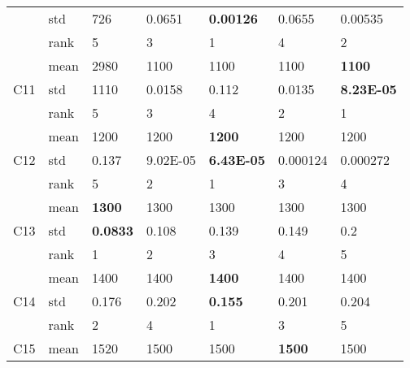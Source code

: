 \begin{table}[]
\begin{tabular}{|l|l|l|l|l|l|l|}
                     & std  & 726              & 0.0651            & \textbf{0.00126}  & 0.0655            & 0.00535           \\ \cline{2-7} 
                     & rank & 5                & 3                 & 1                 & 4                 & 2                 \\ \hline
\multirow{3}{*}{C11} & mean & 2980             & 1100              & 1100              & 1100              & \textbf{1100}     \\ \cline{2-7} 
                     & std  & 1110             & 0.0158            & 0.112             & 0.0135            & \textbf{8.23E-05} \\ \cline{2-7} 
                     & rank & 5                & 3                 & 4                 & 2                 & 1                 \\ \hline
\multirow{3}{*}{C12} & mean & 1200             & 1200              & \textbf{1200}     & 1200              & 1200              \\ \cline{2-7} 
                     & std  & 0.137            & 9.02E-05          & \textbf{6.43E-05} & 0.000124          & 0.000272          \\ \cline{2-7} 
                     & rank & 5                & 2                 & 1                 & 3                 & 4                 \\ \hline
\multirow{3}{*}{C13} & mean & \textbf{1300}    & 1300              & 1300              & 1300              & 1300              \\ \cline{2-7} 
                     & std  & \textbf{0.0833}  & 0.108             & 0.139             & 0.149             & 0.2               \\ \cline{2-7} 
                     & rank & 1                & 2                 & 3                 & 4                 & 5                 \\ \hline
\multirow{3}{*}{C14} & mean & 1400             & 1400              & \textbf{1400}     & 1400              & 1400              \\ \cline{2-7} 
                     & std  & 0.176            & 0.202             & \textbf{0.155}    & 0.201             & 0.204             \\ \cline{2-7} 
                     & rank & 2                & 4                 & 1                 & 3                 & 5                 \\ \hline
\multirow{3}{*}{C15} & mean & 1520             & 1500              & 1500              & \textbf{1500}     & 1500              \\ \cline{2-7} 

\end{tabular}
\end{table}
